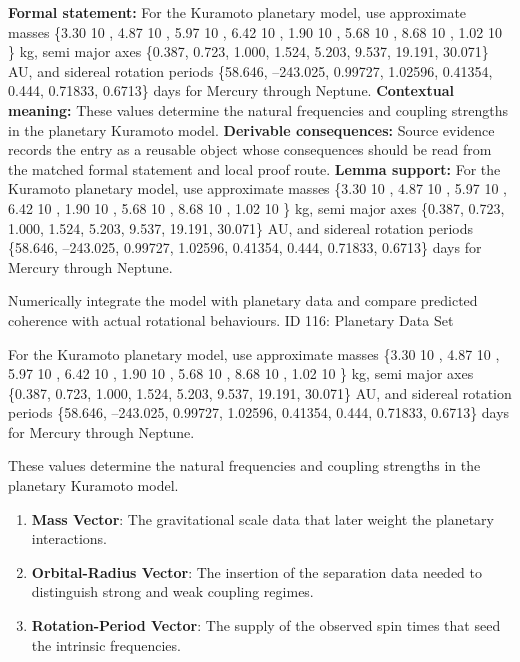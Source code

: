 \begingroup\footnotesize\setlength{\emergencystretch}{3em}\sloppy
\textbf{Formal statement:} For the Kuramoto planetary model, use approximate masses \{3.30   10  , 4.87   10  , 5.97   10  , 6.42   10  , 1.90   10  , 5.68   10  , 8.68   10  , 1.02   10  \} kg, semi major axes \{0.387, 0.723, 1.000, 1.524, 5.203, 9.537, 19.191, 30.071\} AU, and sidereal rotation periods \{58.646, --243.025, 0.99727, 1.02596, 0.41354, 0.444, 0.71833, 0.6713\} days for Mercury through Neptune.
\textbf{Contextual meaning:} These values determine the natural frequencies and coupling strengths in the planetary Kuramoto model.
\textbf{Derivable consequences:} Source evidence records the entry as a reusable object whose consequences should be read from the matched formal statement and local proof route.
\textbf{Lemma support:} For the Kuramoto planetary model, use approximate masses \{3.30   10  , 4.87   10  , 5.97   10  , 6.42   10  , 1.90   10  , 5.68   10  , 8.68   10  , 1.02   10  \} kg, semi major axes \{0.387, 0.723, 1.000, 1.524, 5.203, 9.537, 19.191, 30.071\} AU, and sidereal rotation periods \{58.646, --243.025, 0.99727, 1.02596, 0.41354, 0.444, 0.71833, 0.6713\} days for Mercury through Neptune.\par
\endgroup

Numerically integrate the model with planetary data and compare predicted coherence with actual rotational behaviours. ID 116: Planetary Data Set

For the Kuramoto planetary model, use approximate masses \{3.30   10  , 4.87   10  , 5.97   10  , 6.42   10  , 1.90   10  , 5.68   10  , 8.68   10  , 1.02   10  \} kg, semi major axes \{0.387, 0.723, 1.000, 1.524, 5.203, 9.537, 19.191, 30.071\} AU, and sidereal rotation periods \{58.646, --243.025, 0.99727, 1.02596, 0.41354, 0.444, 0.71833, 0.6713\} days for Mercury through Neptune.

These values determine the natural frequencies and coupling strengths in the planetary Kuramoto model.
\endgroup

\begin{enumerate}[leftmargin=1.6em,itemsep=6pt,topsep=4pt]
\item \textbf{Mass Vector}: The gravitational scale data that later weight the planetary interactions.
\item \textbf{Orbital-Radius Vector}: The insertion of the separation data needed to distinguish strong and weak coupling regimes.
\item \textbf{Rotation-Period Vector}: The supply of the observed spin times that seed the intrinsic frequencies.
\end{enumerate}

